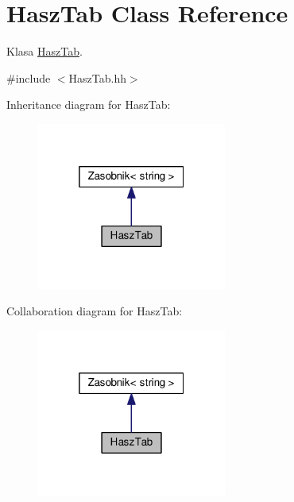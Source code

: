\hypertarget{a00010}{}\section{Hasz\+Tab Class Reference}
\label{a00010}


Klasa \hyperlink{a00010}{Hasz\+Tab}.  




{\ttfamily \#include $<$Hasz\+Tab.\+hh$>$}



Inheritance diagram for Hasz\+Tab\+:
\nopagebreak
\begin{figure}[H]
\begin{center}
\leavevmode
\includegraphics[width=176pt]{a00128}
\end{center}
\end{figure}


Collaboration diagram for Hasz\+Tab\+:
\nopagebreak
\begin{figure}[H]
\begin{center}
\leavevmode
\includegraphics[width=176pt]{a00129}
\end{center}
\end{figure}
